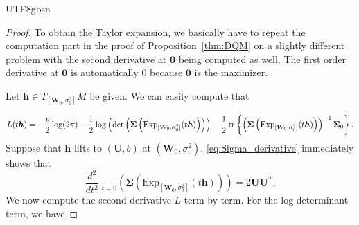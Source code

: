 \documentclass[12pt]{report}
\newcommand{\bracket}[1]{\left ( #1 \right )}
\newcommand{\curly}[1]{\left \{ #1 \right \} }
\theoremstyle{plain}
\theoremstyle{definition}
\begin{document}
\begin{CJK*}{UTF8}{gbsn}
\begin{proof}
To obtain the Taylor expansion, we basically have to repeat 
the computation part in the proof of Proposition~\ref{thm:DQM} on a slightly 
different problem with the second derivative at $\bm{0}$ being computed as well.
The first order derivative at $\bm{0}$ is automatically $0$ because $\bm{0}$ is the maximizer.

Let $\bm{h} \in T_{[\bm{W}_0, \sigma_0^2]}M$ be given.
We can easily compute that

\begin{equation*}
  L(t \bm{h}) = - \frac{p}{2} \log(2\pi) - \frac{1}{2}\log\bracket{\det \bracket{\bm{\Sigma}\bracket{\text{Exp}_{[\bm{W}_0, \sigma_0^2]}(t\bm{h})}}}
  - \frac{1}{2} \tr\curly{
  \bracket{\bm{\Sigma}\bracket{\text{Exp}_{[\bm{W}_0, \sigma_0^2]}(t\bm{h})}}^{-1} \bm{\Sigma}_0}.
\end{equation*}
Suppose that $\bm{h}$ lifts to $(\bm{U},b)$ at $(\bm{W}_0,\sigma_0^2)$.
\eqref{eq:Sigma_derivative} immediately shows that
\begin{equation*}
  \frac{d^2}{dt^2}\bigg|_{t=0} \bracket{\bm{\Sigma}\bracket{\text{Exp}_{[\bm{W}_0, \sigma_0^2]}(t\bm{h})}}
  = 2 \bm{U}\bm{U}^T.
\end{equation*}
We now compute the second derivative $L$ term by term.
For the log determinant term, we have


\end{proof}
\end{CJK*}
\end{document}
